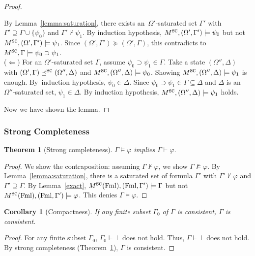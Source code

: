\documentclass[doctor]{iscs-thesis}
\newcommand{\fml}{\operatorname{Fml}}
\newtheorem{corollary}{Corollary}
\newtheorem{theorem}{Theorem}
\begin{document}
\begin{proof}
\begin{description}
	    By Lemma~\ref{lemma:saturation}, there exists an~$\Omega'$-saturated
	    set $\Gamma'$ with
	    $\Gamma'\supseteq \Gamma\cup \{\psi_0\}$ and $\Gamma'\not\vdash\psi_1$.
	    By induction hypothesis, $M^{\mbox{sc}}, (\Omega',\Gamma')\models \psi_0$ but not
	    $M^{\mbox{sc}}, (\Omega',\Gamma')\models \psi_1$.
	    Since $(\Omega',\Gamma')\succeq(\Omega',\Gamma)$,
	    this contradicts to $M^{\mbox{sc}}, \Gamma\models \psi_0\supset\psi_1$.\\
	    ($\Leftarrow$)
	    For an $\Omega'$-saturated set $\Gamma$\kern -1pt,
	    assume $\psi_0\supset \psi_1\in \Gamma$.
	    Take a state $(\Omega'',\Delta)$ with
	    $(\Omega',\Gamma)\preceq^{\mbox{sc}} (\Omega'',\Delta)$ and
	    $M^{\mbox{sc}}, (\Omega'',\Delta)\models \psi_0$.
	    Showing $M^{\mbox{sc}}, (\Omega'',\Delta)\models \psi_1$ is enough.
	    By~induction hypothesis, $\psi_0\in\Delta$.
	    Since $\psi_0\supset \psi_1\in \Gamma\subseteq\Delta$ and $\Delta$ is
	    an~$\Omega''$-saturated set, $\psi_1\in\Delta$.
	    By induction hypothesis, $M^{\mbox{sc}}, (\Omega'',\Delta)\models \psi_1$ holds.
\end{description}
 Now we have shown the lemma.
\end{proof}

\subsubsection{Strong Completeness}

\begin{theorem}[Strong completeness]
 \label{strong-completeness}
 $\Gamma\models\varphi$ implies $\Gamma\vdash\varphi$.
\end{theorem}
\begin{proof}
 We show the contraposition: assuming $\Gamma\not\vdash\varphi$, we show
 $\Gamma\not\models\varphi$.
 By Lemma~\ref{lemma:saturation},
 there is a saturated set of formula $\Gamma'$ with $\Gamma'\not\vdash\varphi$
 and $\Gamma'\supseteq\Gamma$.
 By Lemma~\ref{exact},
 $\canon M(\fml), (\fml,\Gamma')\models \Gamma$ but not $\canon M(\fml),
 (\fml,\Gamma') \models \varphi$.
 This denies $\Gamma\models\varphi$. 
\end{proof}

\begin{corollary}[Compactness]
 \label{compactness}
 If any finite subset $\Gamma_0$ of $\Gamma$ is consistent,
 $\Gamma$ is consistent.
\end{corollary}
\begin{proof}
 For any finite subset $\Gamma_0$, $\Gamma_0\vdash\bot$ does not hold.
 Thus, $\Gamma\vdash\bot$ does not hold.
 By strong completeness (Theorem~\ref{strong-completeness}),
 $\Gamma$ is consistent.
\end{proof}
\end{document}
